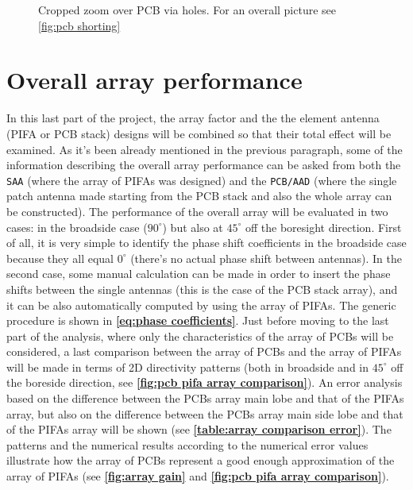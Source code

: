 \documentclass[10 pt,a4paper,twocolumn]{article}
\begin{document}
{\begin{figure}[bt!]
		\def\svgwidth{\linewidth}
		\tiny{}
	\caption{Cropped zoom over PCB via holes. For an overall picture see \cref{fig:pcb shorting}}
	\label{fig:pcb shorting zoom}
\end{figure}






\section*{Overall array performance}
In this last part of the project, the array factor and the the element antenna (PIFA or PCB stack) designs will be combined so that their total effect will be examined. As it's been already mentioned in the previous paragraph, some of the information describing the overall array performance can be asked from both the \texttt{\color{Mahogany}SAA} (where the array of PIFAs was designed) and the \texttt{\color{Mahogany}PCB/AAD} (where the single patch antenna made starting from the PCB stack and also the whole array can be constructed). The performance of the overall array will be evaluated in two cases: in the broadside case ($90^\circ$) but also at $45^\circ$ off the boresight direction. First of all, it is very simple to identify the phase shift coefficients in the broadside case because they all equal $0^\circ$ (there's no actual phase shift between antennas). In the second case, some manual calculation can be made in order to insert the phase shifts between the single antennas (this is the case of the PCB stack array), and it can be also automatically computed by using the array of PIFAs. The generic procedure is shown in \textbf{\cref{eq:phase coefficients}}. Just before moving to the last part of the analysis, where only the characteristics of the array of PCBs will be considered, a last comparison between the array of PCBs and the array of PIFAs will be made in terms of 2D directivity patterns (both in broadside and in $45^\circ$ off the boreside direction, see \textbf{\cref{fig:pcb pifa array comparison}}). An error analysis based on the difference between the PCBs array main lobe and that of the PIFAs array, but also on the difference between the PCBs array main side lobe and that of the PIFAs array will be shown (see \textbf{\cref{table:array comparison error}}). The patterns and the numerical results according to the numerical error values illustrate how the array of PCBs represent a good enough approximation of the array of PIFAs (see \textbf{\cref{fig:array gain}} and \textbf{\cref{fig:pcb pifa array comparison}}). 

}
\end{document}
